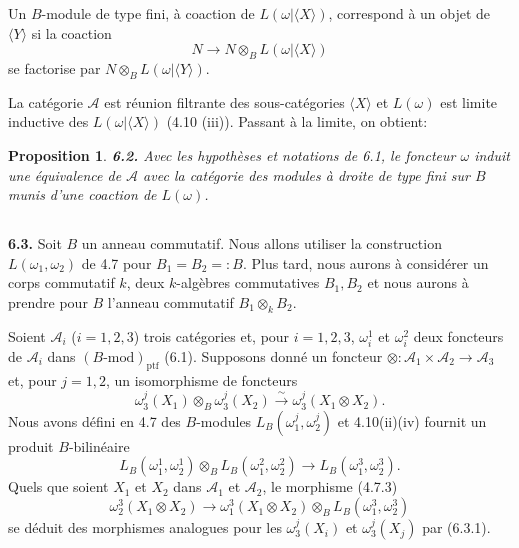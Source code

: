\documentclass[12pt,a4paper]{article}
\theoremstyle{plain}
\newtheorem{proposition}[theorem]{Proposition}
\theoremstyle{definition}
\theoremstyle{remark}
\begin{document}
Un $B$-module de type fini, à coaction de $L(\omega|\langle X \rangle)$, correspond à un objet de $\langle Y \rangle$ si la coaction
\[
N \to N \otimes_B L(\omega|\langle X \rangle)
\]
se factorise par $N \otimes_B L(\omega|\langle Y \rangle)$.

La catégorie $\mathcal{A}$ est réunion filtrante des sous-catégories $\langle X \rangle$ et $L(\omega)$ est limite inductive des $L(\omega|\langle X \rangle)$ (4.10 (iii)). Passant à la limite, on obtient:

\begin{proposition}\label{prop:6.2}
\textbf{6.2.} Avec les hypothèses et notations de 6.1, le foncteur $\omega$ induit une équivalence de $\mathcal{A}$ avec la catégorie des modules à droite de type fini sur $B$ munis d'une coaction de $L(\omega)$.
\end{proposition}

\subsection{}

\textbf{6.3.} Soit $B$ un anneau commutatif. Nous allons utiliser la construction $L(\omega_1,\omega_2)$ de 4.7 pour $B_1 = B_2 =: B$. Plus tard, nous aurons à considérer un corps commutatif $k$, deux $k$-algèbres commutatives $B_1, B_2$ et nous aurons à prendre pour $B$ l'anneau commutatif $B_1 \otimes_k B_2$.

Soient $\mathcal{A}_i$ ($i = 1,2,3$) trois catégories et, pour $i = 1,2,3$, $\omega_i^1$ et $\omega_i^2$ deux foncteurs de $\mathcal{A}_i$ dans $(B\text{-mod})_\mathrm{ptf}$ (6.1). Supposons donné un foncteur $\otimes : \mathcal{A}_1 \times \mathcal{A}_2 \to \mathcal{A}_3$ et, pour $j = 1,2$, un isomorphisme de foncteurs
\[
\omega_3^j(X_1) \otimes_B \omega_3^j(X_2) \xrightarrow{\sim} \omega_3^j(X_1 \otimes X_2).
\]
Nous avons défini en 4.7 des $B$-modules $L_B(\omega_1^j, \omega_2^j)$ et 4.10(ii)(iv) fournit un produit $B$-bilinéaire
\begin{equation}\label{eq:6.3.1}
L_B(\omega_1^1, \omega_2^1) \otimes_B L_B(\omega_1^2, \omega_2^2) \longrightarrow L_B(\omega_1^3, \omega_2^3).
\end{equation}
Quels que soient $X_1$ et $X_2$ dans $\mathcal{A}_1$ et $\mathcal{A}_2$, le morphisme (4.7.3)
\[
\omega_2^3(X_1 \otimes X_2) \to \omega_1^3(X_1 \otimes X_2) \otimes_B L_B(\omega_1^3, \omega_2^3)
\]
se déduit des morphismes analogues pour les $\omega_3^j(X_i)$ et $\omega_3^j(X_j)$ par (6.3.1).
\end{document}
